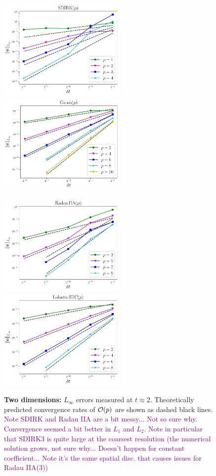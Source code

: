 \documentclass[review]{siamart}
\newcommand{\tcp}{\textcolor{purple}}
\begin{document}
\begin{figure}[H]
\centerline{
\includegraphics[width = 0.55\textwidth]{figures/SDIRK_d2_FD4}
\quad
\includegraphics[width = 0.55\textwidth]{figures/Gauss_d2_FD4}
}
\centerline{
\includegraphics[width = 0.55\textwidth]{figures/RadauIIA_d2_FD4}
\quad
\includegraphics[width = 0.55\textwidth]{figures/LobattoIIIC_d2_FD4}
}
\caption{\textbf{Two dimensions:} $L_{\infty}$ errors measured at $t \approx 2$. Theoretically predicted convergence rates of ${\cal O}(p)$ are shown as dashed black lines. \tcp{Note SDIRK and Radau IIA are a bit messy... Not so sure why. Convergence seemed a bit better in $L_1$ and $L_2$. Note in particular that SDIRK3 is quite large at the coarsest resolution (the numerical solution grows, not sure why... Doesn't happen for constant coefficient... Note it's the same spatial disc. that causes issues for Radau IIA(3))}
\label{fig:errors2D}
}
\end{figure}
\end{document}
